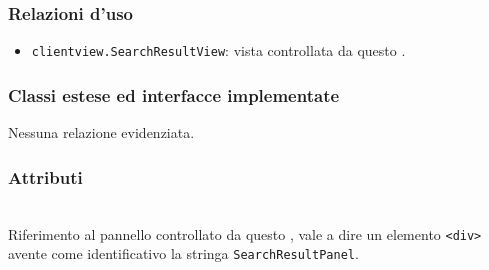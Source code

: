 \subsubsection*{Relazioni d'uso}
\begin{itemize}
  \item \texttt{clientview.SearchResultView}: vista controllata da questo .
\end{itemize}

\subsubsection*{Classi estese ed interfacce implementate}
Nessuna relazione evidenziata.

\subsubsection*{Attributi}
\begin{description}
\item{}\\
Riferimento al pannello controllato da questo , vale a dire un elemento \verb'<div>' avente come identificativo la stringa \verb'SearchResultPanel'.
\end{description}

